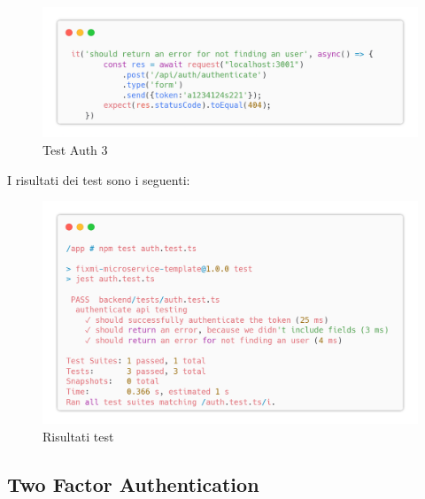 \documentclass{report}
\begin{document}
\begin{figure}[H]
	\centering\includegraphics[width=1\textwidth]{images/microservizio-autenticazione/tests/auth_test_3.png}
	\caption{Test Auth 3}
\end{figure}
I risultati dei test sono i seguenti:
\begin{figure}[H]
	\centering\includegraphics[width=1\textwidth]{images/microservizio-autenticazione/tests/auth_test_results.png}
	\caption{Risultati test}
\end{figure}
\subsection{Two Factor Authentication}
\end{document}
